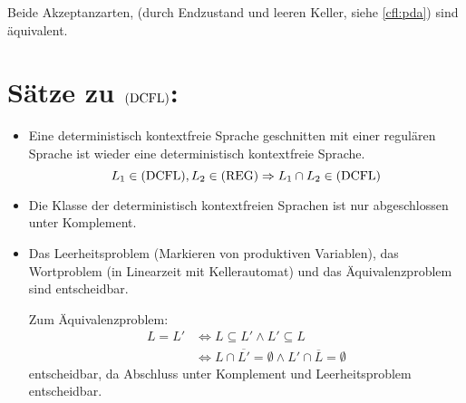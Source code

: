 Beide Akzeptanzarten, (durch Endzustand und leeren Keller, siehe \autoref{cfl:pda}) sind äquivalent.


\section{Sätze zu $\mathrm{(DCFL)}$:}
\begin{itemize}
	\item Eine deterministisch kontextfreie Sprache geschnitten mit einer regulären Sprache ist wieder eine deterministisch kontextfreie Sprache.
	\begin{equation*}
		L_1\in\mathrm{(DCFL)}, L_2\in\mathrm{(REG)} \Rightarrow L_1\cap L_2\in\mathrm{(DCFL)}
	\end{equation*}
	\item Die Klasse der deterministisch kontextfreien Sprachen ist nur abgeschlossen unter Komplement.
	\item Das Leerheitsproblem (Markieren von produktiven Variablen), das Wortproblem (in Linearzeit mit Kellerautomat) und das Äquivalenzproblem sind entscheidbar.

	Zum Äquivalenzproblem:
	\begin{align*}
		L=L'&\Leftrightarrow L\subseteq L' \wedge L'\subseteq L\\
				&\Leftrightarrow L\cap \overline{L'} = \emptyset \wedge L'\cap \overline L=\emptyset
	\end{align*}
	entscheidbar, da Abschluss unter Komplement und Leerheitsproblem entscheidbar.
\end{itemize}


